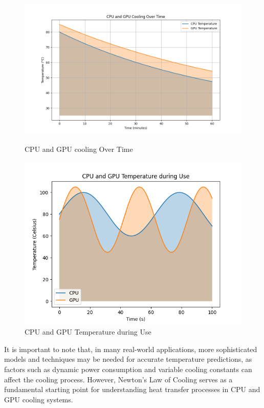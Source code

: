 \documentclass[12pt, a4paper]{article}
\begin{document}
\begin{figure}[h]
    \centering
    \begin{minipage}[b]{0.45\textwidth}
        \includegraphics[width=\textwidth]{./3.png}
        \caption{CPU and GPU cooling Over Time}
    \end{minipage}
    \hfill
    \begin{minipage}[b]{0.45\textwidth}
        \includegraphics[width=\textwidth]{./4.png}
        \caption{CPU and GPU Temperature during Use}
    \end{minipage}
\end{figure}


It is important to note that, in many real-world applications, more sophisticated models and techniques may be needed for accurate temperature predictions, as factors such as dynamic power consumption and variable cooling constants can affect the cooling process. However, Newton's Law of Cooling serves as a fundamental starting point for understanding heat transfer processes in CPU and GPU cooling systems.
\end{document}
